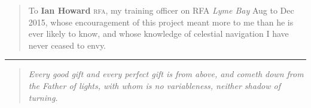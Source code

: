 \vspace*{\fill}

\newpage

\thispagestyle{empty}

\vspace*{\fill}

\begin{quote}
    To \textbf{Ian Howard} \textsc{rfa}, my training officer on RFA \textit{Lyme Bay} Aug to Dec 2015, whose encouragement of this project meant more to me than he is ever likely to know, and whose knowledge of celestial navigation I have never ceased to envy.
\end{quote}

\begin{center}
    \rule{0.5\textwidth}{0.5pt}
\end{center}
\bigskip

\begin{quote}
    \textit{Every good gift and every perfect gift is from above, and cometh down from the Father of lights, with whom is no variableness, neither shadow of turning.}
\end{quote}

\vspace*{\fill}
